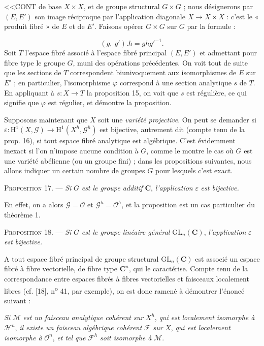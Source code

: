 <<CONT de base $X \times X$, et de groupe structural $G \times G$ ; nous désignerons par $(E, E')$ son image réciproque par l'application diagonale $X \to X \times X$ : c'est le « produit fibré » de $E$ et de $E'$. Faisons opérer $G \times G$ sur $G$ par la formule :

\begin{equation*}
(g,\ g').h = gh{g'}^{-1}.
\end{equation*}
Soit $T$ l'espace fibré associé à l'espace fibré principal $(E, E')$ et admettant pour fibre type le groupe $G$, muni des opérations précédentes. On voit tout de suite que les sections de $T$ correspondent biunivoquement aux isomorphismes de $E$ sur $E'$ ; en particulier, l'isomorphisme $\varphi$ correspond à une section analytique $s$ de $T$. En appliquant à $s : X \to T$ la proposition 15, on voit que $s$ est régulière, ce qui signifie que $\varphi$ est régulier, et démontre la proposition.

Supposons maintenant que $X$ soit une \textit{variété projective}. On peut se demander si $\varepsilon : \mathrm{H}^1(X, \mathcal{G}) \to \mathrm{H}^1(X^h, \mathcal{G}^h)$ est bijective, autrement dit (compte tenu de la prop. 16), si tout espace fibré analytique est algébrique. C'est évidemment inexact si l'on n'impose aucune condition à $G$, comme le montre le cas où $G$ est une variété abélienne (ou un groupe fini) ; dans les propositions suivantes, nous allons indiquer un certain nombre de groupes $G$ pour lesquels c'est exact.

\textsc{Proposition} 17. --- \textit{Si} $G$ \textit{est le groupe additif} $\mathbf{C}$, \textit{l'application} $\varepsilon$ \textit{est bijective.}

En effet, on a alors $\mathcal{G} = \mathcal{O}$ et $\mathcal{G}^h = \mathcal{O}^h$, et la proposition est un cas particulier du théorème 1.

\textsc{Proposition} 18. --- \textit{Si} $G$ \textit{est le groupe linéaire général} $\mathrm{GL}_n(\mathbf{C})$, \textit{l'application} $\varepsilon$ \textit{est bijective.}

A tout espace fibré principal de groupe structural $\mathrm{GL}_n(\mathbf{C})$ est associé un espace fibré à fibre vectorielle, de fibre type $\mathbf{C}^n$, qui le caractérise. Compte tenu de la correspondance entre espaces fibrés à fibres vectorielles et faisceaux localement libres (cf. [18], n\textsuperscript{o} 41, par exemple), on est donc ramené à démontrer l'énoncé suivant :

\textit{Si} $\mathcal{M}$ \textit{est un faisceau analytique cohérent sur} $X^h$, \textit{qui est localement isomorphe à} $\mathcal{H}^n$, \textit{il existe un faisceau algébrique cohérent} $\mathcal{F}$ \textit{sur} $X$, \textit{qui est localement isomorphe à} $\mathcal{O}^n$, \textit{et tel que} $\mathcal{F}^h$ \textit{soit isomorphe à} $\mathcal{M}$.


